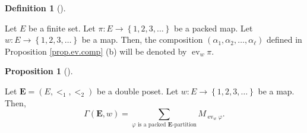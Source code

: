 \documentclass[numbers=enddot,12pt,final,onecolumn,notitlepage,abstracton]{scrartcl}
\theoremstyle{definition}
\newtheorem{prop}[theo]{Proposition}
\newenvironment{proposition}[1][]
{\begin{prop}[#1]\begin{leftbar}}
{\end{leftbar}\end{prop}}
\newtheorem{defi}[theo]{Definition}
\newenvironment{definition}[1][]
{\begin{defi}[#1]\begin{leftbar}}
{\end{leftbar}\end{defi}}
\let\sumnonlimits\sum
\renewcommand{\sum}{\sumnonlimits\limits}
\newcommand{\ev}{\operatorname{ev}}
\newcommand{\EE}{{\mathbf{E}}}
\begin{document}
\begin{definition}
Let $E$ be a finite set.
Let $\pi : E \to \left\{1, 2, 3, \ldots\right\}$ be a packed map.
Let $w : E \to \left\{1, 2, 3, \ldots\right\}$ be a map. Then, the
composition $\left(\alpha_1, \alpha_2, \ldots, \alpha_\ell\right)$
defined in Proposition \ref{prop.ev.comp} (b) will be denoted by
$\ev_w \pi$.
\end{definition}

\begin{proposition}
\label{prop.Gammaw.packed}
Let $\EE = \left(E, <_1, <_2\right)$ be a double poset. Let
$w : E \to \left\{1, 2, 3, \ldots\right\}$ be a map.
Then,
\begin{equation}
\label{eq.prop.Gammaw.packed}
\Gamma\left(\EE , w\right)
= \sum_{\varphi \text{ is a packed } \EE\text{-partition}}
M_{\ev_w \varphi} .
\end{equation}
\end{proposition}
\end{document}
